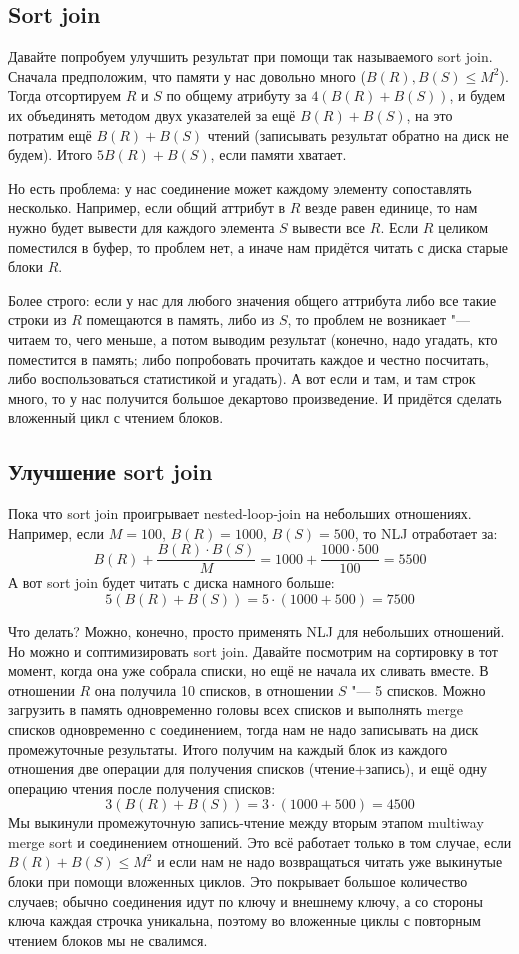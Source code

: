 \subsection{Sort join}
	Давайте попробуем улучшить результат при помощи так называемого sort join.
	Сначала предположим, что памяти у нас довольно много ($B(R), B(S) \le M^2$).
	Тогда отсортируем $R$ и $S$ по общему атрибуту за $4(B(R)+B(S))$,
	и будем их объединять методом двух указателей за ещё $B(R)+B(S)$,
	на это потратим ещё $B(R)+B(S)$ чтений (записывать результат обратно на диск не будем).
	Итого $5B(R)+B(S)$, если памяти хватает.

	Но есть проблема: у нас соединение может каждому элементу сопоставлять несколько.
	Например, если общий аттрибут в $R$ везде равен единице, то нам нужно будет
	вывести для каждого элемента $S$ вывести все $R$.
	Если $R$ целиком поместился в буфер, то проблем нет, а иначе нам придётся читать с диска
	старые блоки $R$.

	Более строго: если у нас для любого значения общего аттрибута либо все такие строки
	из $R$ помещаются в память, либо из $S$, то проблем не возникает "--- читаем то,
	чего меньше, а потом выводим результат (конечно, надо угадать, кто поместится в память;
	либо попробовать прочитать каждое и честно посчитать, либо воспользоваться статистикой и угадать).
	А вот если и там, и там строк много, то у нас получится большое декартово произведение.
	И придётся сделать вложенный цикл с чтением блоков.

\subsection{Улучшение sort join}
	Пока что sort join проигрывает nested-loop-join на небольших отношениях.
	Например, если $M=100$, $B(R)=1000$, $B(S)=500$, то NLJ отработает за:
	\[
		B(R) + \frac{B(R)\cdot B(S)}{M} = 1000+\frac{1000\cdot500}{100}=5500
	\]
	А вот sort join будет читать с диска намного больше:
	\[
		5(B(R)+B(S)) = 5 \cdot (1000+500) = 7500
	\]

	Что делать?
	Можно, конечно, просто применять NLJ для небольших отношений.
	Но можно и соптимизировать sort join.
	Давайте посмотрим на сортировку в тот момент, когда она уже собрала списки,
	но ещё не начала их сливать вместе.
	В отношении $R$ она получила 10 списков, в отношении $S$ "--- 5 списков.
	Можно загрузить в память одновременно головы всех списков и выполнять merge списков
	одновременно с соединением, тогда нам не надо записывать на диск промежуточные результаты.
	Итого получим на каждый блок из каждого отношения две операции для получения списков (чтение+запись),
	и ещё одну операцию чтения после получения списков:
	\[
		3(B(R)+B(S)) = 3 \cdot (1000+500) = 4500
	\]
	Мы выкинули промежуточную запись-чтение между вторым этапом multiway merge sort и соединением отношений.
	Это всё работает только в том случае, если $B(R)+B(S) \le M^2$ и если нам не надо возвращаться читать уже выкинутые блоки при помощи вложенных циклов.
	Это покрывает большое количество случаев; обычно соединения идут по ключу и внешнему ключу, а со стороны ключа каждая строчка уникальна,
	поэтому во вложенные циклы с повторным чтением блоков мы не свалимся.

